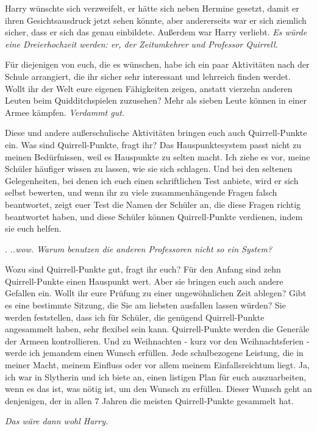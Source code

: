 Harry wünschte sich verzweifelt, er hätte sich neben Hermine gesetzt, damit er
ihren Gesichtsausdruck jetzt sehen könnte, aber andererseits war er sich
ziemlich sicher, dass er sich das genau einbildete. Außerdem war Harry verliebt.
\emph{Es würde eine Dreierhochzeit werden: er, der Zeitumkehrer und Professor
Quirrell.}

\glqq Für diejenigen von euch, die es wünschen, habe ich ein paar Aktivitäten
nach der Schule arrangiert, die ihr sicher sehr interessant und lehrreich finden
werdet. Wollt ihr der Welt eure eigenen Fähigkeiten zeigen, anstatt vierzehn
anderen Leuten beim Quidditchspielen zuzusehen? Mehr als sieben Leute können in
einer Armee kämpfen.\grqq{} \emph{Verdammt gut.}

\glqq Diese und andere außerschulische Aktivitäten bringen euch auch
Quirrell-Punkte ein. Was sind Quirrell-Punkte, fragt ihr? Das Hauspunktesystem
passt nicht zu meinen Bedürfnissen, weil es Hauspunkte zu selten macht. Ich
ziehe es vor, meine Schüler häufiger wissen zu lassen, wie sie sich schlagen.
Und bei den seltenen Gelegenheiten, bei denen ich euch einen schriftlichen Test
anbiete, wird er sich selbst bewerten, und wenn ihr zu viele zusammenhängende
Fragen falsch beantwortet, zeigt euer Test die Namen der Schüler an, die diese
Fragen richtig beantwortet haben, und diese Schüler können Quirrell-Punkte
verdienen, indem sie euch helfen.\grqq{}

. \emph{..wow. Warum benutzen die anderen Professoren nicht so ein System?}

\glqq Wozu sind Quirrell-Punkte gut, fragt ihr euch? Für den Anfang sind zehn
Quirrell-Punkte einen Hauspunkt wert. Aber sie bringen euch auch andere Gefallen
ein. Wollt ihr eure Prüfung zu einer ungewöhnlichen Zeit ablegen? Gibt es eine
bestimmte Sitzung, die Sie am liebsten ausfallen lassen würden? Sie werden
feststellen, dass ich für Schüler, die genügend Quirrell-Punkte angesammelt
haben, sehr flexibel sein kann. Quirrell-Punkte werden die Generäle der Armeen
kontrollieren. Und zu Weihnachten - kurz vor den Weihnachtsferien - werde ich
jemandem einen Wunsch erfüllen. Jede schulbezogene Leistung, die in meiner
Macht, meinem Einfluss oder vor allem meinem Einfallsreichtum liegt. Ja, ich war
in Slytherin und ich biete an, einen listigen Plan für euch auszuarbeiten, wenn
es das ist, was nötig ist, um den Wunsch zu erfüllen. Dieser Wunsch geht an
denjenigen, der in allen 7 Jahren die meisten Quirrell-Punkte gesammelt
hat.\grqq{}

\emph{Das wäre dann wohl Harry.}

